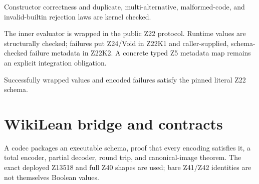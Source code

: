 \begin{lemma}\label{lem:elaboration-rejects}
  \leanok
  Constructor correctness and duplicate, multi-alternative, malformed-code, and invalid-builtin
  rejection laws are kernel checked.
\end{lemma}

\begin{definition}\label{def:result}
  \leanok
  The inner evaluator is wrapped in the public Z22 protocol.  Runtime values are structurally
  checked; failures put Z24/Void in Z22K1 and caller-supplied, schema-checked failure metadata in
  Z22K2.  A concrete typed Z5 metadata map remains an explicit integration obligation.
\end{definition}

\begin{lemma}\label{lem:result-valid}
  \leanok
  Successfully wrapped values and encoded failures satisfy the pinned literal Z22 schema.
\end{lemma}

\chapter{WikiLean bridge and contracts}\label{ch:bridge}

\begin{definition}\label{def:codec}
  \leanok
  A codec packages an executable schema, proof that every encoding satisfies it, a total encoder,
  partial decoder, round trip, and canonical-image theorem.  The exact deployed Z13518 and full
  Z40 shapes are used; bare Z41/Z42 identities are not themselves Boolean values.
\end{definition}

